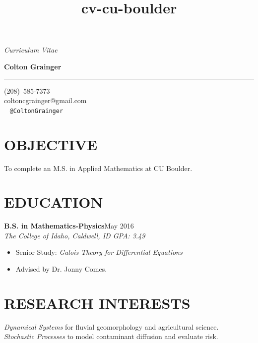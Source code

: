\documentclass[margin]{res}
\title{cv-cu-boulder}
\newcommand\textbox[1]{\parbox{.333\textwidth}{#1} }
\newcommand\degree[3]{\textbf{#1}\hfill {#2}\\ \emph{#3} }
\newcommand\ri[1]{\textsl{#1} }
\newenvironment{details}{\begin{itemize}[itemsep=0.6pt,topsep=2.2pt] }{\end{itemize} }
\begin{document}
\noindent\textbox{{\it Curriculum Vitae }\hfill } \textbox{\hfill{\large\bf Colton Grainger}\hfill }

\vspace{-20pt}
\rule{\textwidth}{1pt}

\vspace{-20pt}
\begin{flushright}
    (208)~585-7373\\ coltoncgrainger@gmail.com\\ \faTwitter\ \faGithub\hspace{1ex} {\tt @ColtonGrainger}
\end{flushright}
\vspace{-24pt}

\begin{resume}

\section{OBJECTIVE}
To complete an M.S. in Applied Mathematics at CU Boulder.

\section{EDUCATION}
\degree{B.S. in Mathematics-Physics}{May 2016}{The College of Idaho, Caldwell, ID \hfill {\rm GPA: 3.49}}
    \begin{details}
   		\item Senior Study: \emph{Galois Theory for Differential Equations}
        \item Advised by Dr. Jonny Comes.
    \end{details}

\section{RESEARCH INTERESTS}
    \ri{Dynamical Systems} for fluvial geomorphology and agricultural science.\\
    \ri{Stochastic Processes} to model contaminant diffusion and evaluate risk.


\end{resume}
\end{document}
